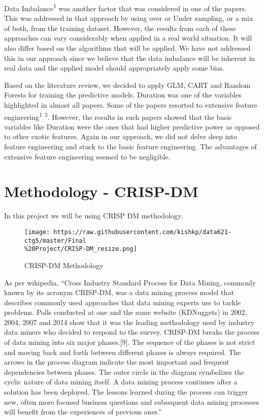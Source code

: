 \documentclass[english,floatsintext,man]{apa6}
\begin{document}
Data Imbalance\textsuperscript{1} was another factor that was considered
in one of the papers. This was addressed in that approach by using over
or Under sampling, or a mix of both, from the training dataset. However,
the results from each of these approaches can vary considerably when
applied in a real world situation. It will also differ based on the
algorithms that will be applied. We have not addressed this in our
approach since we believe that the data imbalance will be inherent in
real data and the applied model should appropriately apply some bias.

Based on the literature review, we decided to apply GLM, CART and Random
Forests for training the predictive models. Duration was one of the
variables highlighted in almost all papers. Some of the papers resorted
to extensive feature engineering\textsuperscript{1} \textsuperscript{3}.
However, the results in such papers showed that the basic variables like
Duration were the ones that had higher predictive power as opposed to
other exotic features. Again in our approach, we did not delve deep into
feature engineering and stuck to the basic feature engineering. The
advantages of extensive feature engineering seemed to be negligible.

\section{Methodology - CRISP-DM}\label{methodology---crisp-dm}

In this project we will be using CRISP DM methodology.

\begin{figure}[htbp]
\centering
\texttt{[image: https://raw.githubusercontent.com/kishkp/data621-ctg5/master/Final\\\%20Project/CRISP-DM\_resize.png]}
\caption{CRISP-DM Methodology}
\end{figure}

As per wikipedia, \enquote{Cross Industry Standard Process for Data
Mining, commonly known by its acronym CRISP-DM, was a data mining
process model that describes commonly used approaches that data mining
experts use to tackle problems. Polls conducted at one and the same
website (KDNuggets) in 2002, 2004, 2007 and 2014 show that it was the
leading methodology used by industry data miners who decided to respond
to the survey. CRISP-DM breaks the process of data mining into six major
phases.{[}9{]}. The sequence of the phases is not strict and moving back
and forth between different phases is always required. The arrows in the
process diagram indicate the most important and frequent dependencies
between phases. The outer circle in the diagram symbolizes the cyclic
nature of data mining itself. A data mining process continues after a
solution has been deployed. The lessons learned during the process can
trigger new, often more focused business questions and subsequent data
mining processes will benefit from the experiences of previous ones.}
\end{document}
